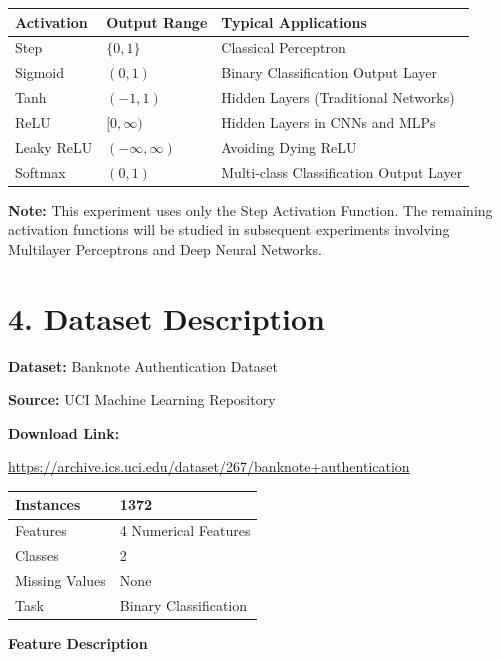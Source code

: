 \documentclass[11pt,a4paper]{article}
\begin{document}
\begin{center}
\begin{tabular}{|p{2.5cm}|p{3cm}|p{6cm}|}
\hline
\textbf{Activation} & \textbf{Output Range} & \textbf{Typical Applications}\\
\hline
Step & $\{0,1\}$ & Classical Perceptron\\
\hline
Sigmoid & $(0,1)$ & Binary Classification Output Layer\\
\hline
Tanh & $(-1,1)$ & Hidden Layers (Traditional Networks)\\
\hline
ReLU & $[0,\infty)$ & Hidden Layers in CNNs and MLPs\\
\hline
Leaky ReLU & $(-\infty,\infty)$ & Avoiding Dying ReLU\\
\hline
Softmax & $(0,1)$ & Multi-class Classification Output Layer\\
\hline
\end{tabular}
\end{center}

\textbf{Note:} This experiment uses only the Step Activation Function. The remaining activation functions will be studied in subsequent experiments involving Multilayer Perceptrons and Deep Neural Networks.


\section*{4. Dataset Description}

\textbf{Dataset:} Banknote Authentication Dataset

\textbf{Source:} UCI Machine Learning Repository

\textbf{Download Link:}

\url{https://archive.ics.uci.edu/dataset/267/banknote+authentication}

\begin{center}
\begin{tabular}{|l|l|}
\hline
Instances & 1372\\
\hline
Features & 4 Numerical Features\\
\hline
Classes & 2\\
\hline
Missing Values & None\\
\hline
Task & Binary Classification\\
\hline
\end{tabular}
\end{center}

\textbf{Feature Description}
\end{document}
